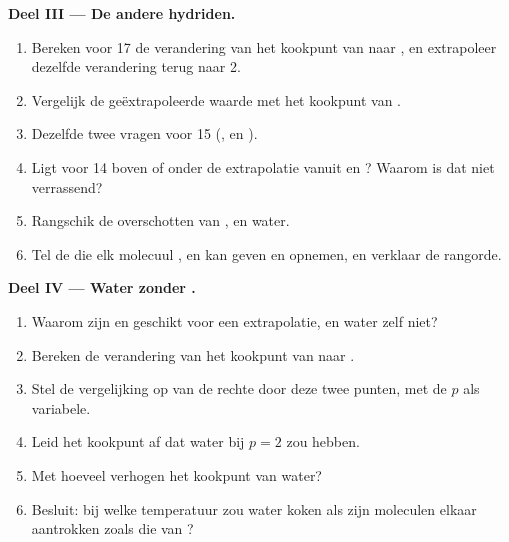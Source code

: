 \begin{problem}
\medskip
\noindent\textbf{Deel III --- De andere hydriden.}
\begin{enumerate}[resume]
  \item Bereken voor  17 de verandering van het kookpunt van 
        naar , en extrapoleer dezelfde verandering terug naar
         2.
  \item Vergelijk de geëxtrapoleerde waarde met het kookpunt van .
  \item Dezelfde twee vragen voor  15 (,  en
        ).
  \item Ligt  voor  14 boven of onder de extrapolatie vanuit
         en ? Waarom is dat niet verrassend?
  \item Rangschik de overschotten van ,  en water.
  \item Tel de  die elk molecuul ,  en
         kan geven en opnemen, en verklaar de rangorde.
\end{enumerate}

\medskip
\noindent\textbf{Deel IV --- Water zonder .}
\begin{enumerate}[resume]
  \item Waarom zijn  en  geschikt voor een extrapolatie,
        en water zelf niet?
  \item Bereken de verandering van het kookpunt van  naar
        .
  \item Stel de vergelijking op van de rechte door deze twee punten, met
        de  $p$ als variabele.
  \item Leid het kookpunt af dat water bij $p = 2$ zou hebben.
  \item Met hoeveel verhogen  het kookpunt van water?
  \item Besluit: bij welke temperatuur zou water koken als zijn moleculen
        elkaar aantrokken zoals die van ?
\end{enumerate}
\end{problem}

